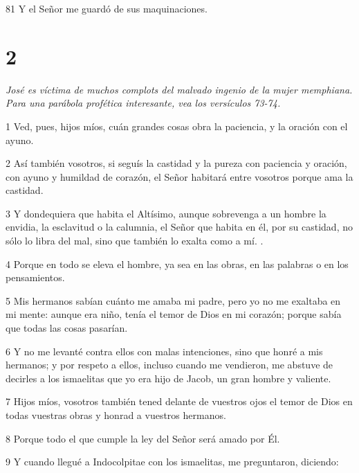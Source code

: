 \par 81 Y el Señor me guardó de sus maquinaciones.

\chapter{2}

\par \textit{José es víctima de muchos complots del malvado ingenio de la mujer memphiana. Para una parábola profética interesante, vea los versículos 73-74.}

\par 1 Ved, pues, hijos míos, cuán grandes cosas obra la paciencia, y la oración con el ayuno.

\par 2 Así también vosotros, si seguís la castidad y la pureza con paciencia y oración, con ayuno y humildad de corazón, el Señor habitará entre vosotros porque ama la castidad.

\par 3 Y dondequiera que habita el Altísimo, aunque sobrevenga a un hombre la envidia, la esclavitud o la calumnia, el Señor que habita en él, por su castidad, no sólo lo libra del mal, sino que también lo exalta como a mí. .

\par 4 Porque en todo se eleva el hombre, ya sea en las obras, en las palabras o en los pensamientos.

\par 5 Mis hermanos sabían cuánto me amaba mi padre, pero yo no me exaltaba en mi mente: aunque era niño, tenía el temor de Dios en mi corazón; porque sabía que todas las cosas pasarían.

\par 6 Y no me levanté contra ellos con malas intenciones, sino que honré a mis hermanos; y por respeto a ellos, incluso cuando me vendieron, me abstuve de decirles a los ismaelitas que yo era hijo de Jacob, un gran hombre y valiente.

\par 7 Hijos míos, vosotros también tened delante de vuestros ojos el temor de Dios en todas vuestras obras y honrad a vuestros hermanos.

\par 8 Porque todo el que cumple la ley del Señor será amado por Él.

\par 9 Y cuando llegué a Indocolpitae con los ismaelitas, me preguntaron, diciendo:

